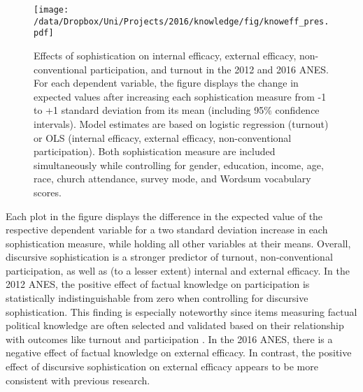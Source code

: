 \begin{figure}[h]\centering
\texttt{[image: /data/Dropbox/Uni/Projects/2016/knowledge/fig/knoweff\_pres.pdf]}
\caption{Effects of sophistication on internal efficacy, external efficacy, non-conventional participation, and turnout in the 2012 and 2016 ANES. For each dependent variable, the figure displays the change in expected values after increasing each sophistication measure from -1 to +1 standard deviation from its mean (including 95\% confidence intervals). Model estimates are based on logistic regression (turnout) or OLS (internal efficacy, external efficacy, non-conventional participation). Both sophistication measure are included simultaneously while controlling for gender, education, income, age, race, church attendance, survey mode, and Wordsum vocabulary scores.
}\label{fig:knoweff}
\end{figure}

Each plot in the figure displays the difference in the expected value of the respective dependent variable for a two standard deviation increase in each sophistication measure, while holding all other variables at their means. Overall, discursive sophistication is a stronger predictor of turnout, non-conventional participation, as well as (to a lesser extent) internal and external efficacy. In the 2012 ANES, the positive effect of factual knowledge on participation is statistically indistinguishable from zero when controlling for discursive sophistication. This finding is especially noteworthy since items measuring factual political knowledge are often selected and validated based on their relationship with outcomes like turnout and participation \citep[c.f.,][]{lupia2015uninformed}. In the 2016 ANES, there is a negative effect of factual knowledge on external efficacy. In contrast, the positive effect of discursive sophistication on external efficacy appears to be more consistent with previous research.


